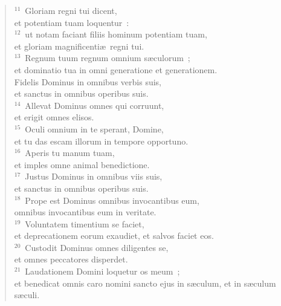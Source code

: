 \begin{flushleft}
\begin{verse}
${}^{11}$~Gloriam regni tui dicent,\\ et potentiam tuam loquentur~:\\
${}^{12}$~ut notam faciant filiis hominum potentiam tuam,\\ et gloriam magnificenti\ae\ regni tui.\\
${}^{13}$~Regnum tuum regnum omnium s\ae culorum~;\\ et dominatio tua in omni generatione et generationem.\\ Fidelis Dominus in omnibus verbis suis,\\ et sanctus in omnibus operibus suis.\\
${}^{14}$~Allevat Dominus omnes qui corruunt,\\ et erigit omnes elisos.\\
${}^{15}$~Oculi omnium in te sperant, Domine,\\ et tu das escam illorum in tempore opportuno.\\
${}^{16}$~Aperis tu manum tuam,\\ et imples omne animal benedictione.\\
${}^{17}$~Justus Dominus in omnibus viis suis,\\ et sanctus in omnibus operibus suis.\\
${}^{18}$~Prope est Dominus omnibus invocantibus eum,\\ omnibus invocantibus eum in veritate.\\
${}^{19}$~Voluntatem timentium se faciet,\\ et deprecationem eorum exaudiet, et salvos faciet eos.\\
${}^{20}$~Custodit Dominus omnes diligentes se,\\ et omnes peccatores disperdet.\\
${}^{21}$~Laudationem Domini loquetur os meum~;\\ et benedicat omnis caro nomini sancto ejus in s\ae culum, et in s\ae culum s\ae culi.\end{verse}\end{flushleft}


